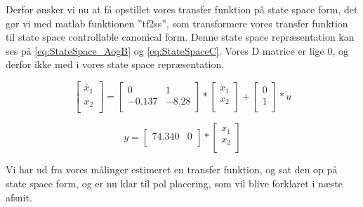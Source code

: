 Derfor ønsker vi nu at få opstillet vores transfer funktion på state space form, det gør vi med matlab funktionen ”tf2ss”, som transformere vores transfer funktion til state space controllable canonical form. Denne state space repræsentation kan ses på \autoref{eq:StateSpace_AogB} og \autoref{eq:StateSpaceC}. Vores D matrice er lige 0, og derfor ikke med i vores state space repræsentation.

\begin{equation}
	\begin{bmatrix}
	\dot{x_1}   \\
	\dot{x_2}   \\
	\end{bmatrix}
	=
	\begin{bmatrix}
	0       &  1  \\
	-0.137      & -8.28 \\
	\end{bmatrix}
	*
	\begin{bmatrix}
	x_1   \\
	x_2   \\
	\end{bmatrix}
	+
	\begin{bmatrix}
	0   \\
	1   \\
	\end{bmatrix}
		*
	u
	\label{eq:StateSpace_AogB}
\end{equation}


\begin{equation}
	y
=
\begin{bmatrix}
74.340      &  0  \\
\end{bmatrix}
*
\begin{bmatrix}
x_1   \\
x_2   \\
\end{bmatrix}
\label{eq:StateSpaceC}
\end{equation}


Vi har ud fra vores målinger estimeret en transfer funktion, og sat den op på state space form, og er nu klar til pol placering, som vil blive forklaret i næste afsnit. 


\newpage